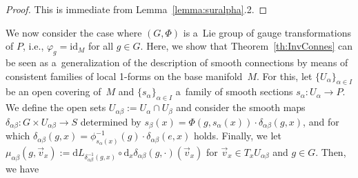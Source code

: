 \documentclass[pdftex]{sigma}
\numberwithin{equation}{section}
\begin{document}
\begin{proof}
This is immediate from Lemma~\ref{lemma:suralpha}.2.
\end{proof}


 We now consider the case where $(G,\Phi)$ is a~Lie group of gauge transformations of $P$, i.e.,
$\varphi_g=\mathrm{id}_M$ for all $g\in G$.
Here, we show that Theorem~\ref{th:InvConnes} can be seen as a~generalization of the description of smooth connections by means of
consistent families of local 1-forms on the base manifold~$M$.
For this, let $\{U_\alpha\}_{\alpha\in I}$ be an open covering of~$M$ and $\{s_\alpha\}_{\alpha\in I}$ a~family of smooth
sections \mbox{$s_\alpha\colon U_\alpha \rightarrow P$}.
We def\/ine the open sets $U_{\alpha\beta}:=U_\alpha \cap U_\beta$ and consider the smooth maps $\delta_{\alpha\beta}\colon G\times
U_{\alpha\beta}\rightarrow S$ determined by $s_\beta(x)=\Phi(g,s_\alpha(x))\cdot
\delta_{\alpha\beta}(g,x)$, and for which $\delta_{\alpha\beta}(g,x)=\phi^{-1}_{s_\alpha(x)}(g)
\cdot\delta_{\alpha\beta}(e,x)$ holds. Finally, we let $\mu_{\alpha\beta}(g,\vec{v}_x):= \mathrm{d}
L_{\delta^{-1}_{\alpha\beta}(g,x)}\circ \mathrm{d}_x\delta_{\alpha\beta}(g,\cdot)(\vec{v}_x)$ for $\vec{v}_x\in
T_xU_{\alpha\beta}$ and $g\in G$.
Then, we have
\end{document}
